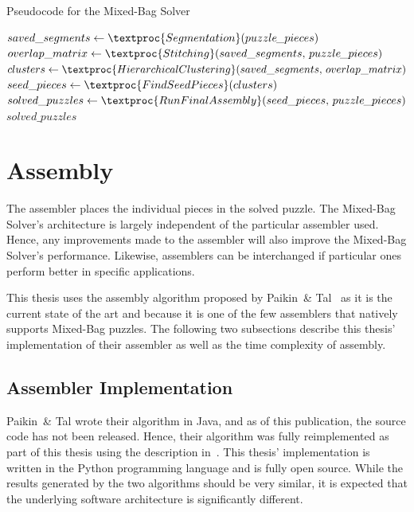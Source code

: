 \begin{algorithm}[t]
  \caption{Pseudocode for the Mixed-Bag Solver}\label{alg:mixedBagSolver}
  \begin{algorithmic}[1]
      \State $saved\_segments \gets \textproc{Segmentation}\text{(} puzzle\hspace{-0.8pt}\_pieces \text{)}$
      \State $overlap\_matrix \gets \textproc{Stitching}\text{(} saved\_segments \text{, } puzzle\hspace{-0.8pt}\_pieces \text{)}$
      \State $clusters \gets \textproc{HierarchicalClustering} \text{(}saved\_segments \text{, } overlap\_matrix \text{)}$
      \State $seed\_pieces \gets \textproc{FindSeedPieces} \text{(} clusters \text{)}$
      \State $solved\_puzzles \gets \textproc{RunFinalAssembly} \text{(} seed\_pieces \text{, } puzzle\hspace{-0.8pt}\_pieces \text{)}$
      \State \Return $solved\_puzzles$
    \EndFunction
  \end{algorithmic}
\end{algorithm}

\section{Assembly}\label{sec:SolverAssembler}

The assembler places the individual pieces in the solved puzzle.  The Mixed-Bag Solver's architecture is largely independent of the particular assembler used.  Hence, any improvements made to the assembler will also improve the Mixed-Bag Solver's performance.  Likewise, assemblers can be interchanged if particular ones perform better in specific applications.  

This thesis uses the assembly algorithm proposed by Paikin~\& Tal~\cite{paikin2015} as it is the current state of the art and because it is one of the few assemblers that natively supports Mixed-Bag puzzles.  The following two subsections describe this thesis' implementation of their assembler as well as the time complexity of assembly.

\subsection{Assembler Implementation}\label{sec:assemblerImplementation}

Paikin~\& Tal wrote their algorithm in Java, and as of this publication, the source code has not been released.  Hence, their algorithm was fully reimplemented as part of this thesis using the description in~\cite{paikin2015}.  This thesis' implementation is written in the Python programming language and is fully open source. While the results generated by the two algorithms should be very similar, it is expected that the underlying software architecture is significantly different. 

